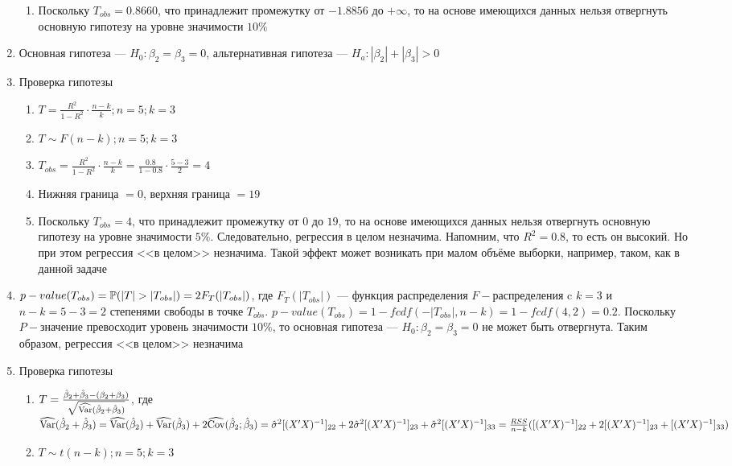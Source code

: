 \begin{solution}
\begin{enumerate}
\begin{enumerate}
\item Поскольку $T_{obs} = 0.8660$, что принадлежит промежутку от $-1.8856$ до $+\infty$, то на основе имеющихся данных нельзя отвергнуть основную гипотезу на уровне значимости $10\%$
\end{enumerate}
\item Основная гипотеза --- $H_0: \beta_2 = \beta_3 = 0$, альтернативная гипотеза --- $H_a: |\beta_2| + |\beta_3| > 0$
\item Проверка гипотезы
\begin{enumerate}
\item $T = \frac{R^2}{1 - R^2} \cdot \frac{n-k}{k}; n = 5; k = 3$
\item $T \sim F(n-k); n = 5; k = 3$
\item $T_{obs} = \frac{R^2}{1 - R^2} \cdot \frac{n-k}{k} = \frac{0.8}{1 - 0.8} \cdot \frac{5-3}{2} = 4$
\item Нижняя граница $= 0$, верхняя граница $= 19$
\item Поскольку $T_{obs} = 4$, что принадлежит промежутку от $0$ до $19$, то на основе имеющихся данных нельзя отвергнуть основную гипотезу на уровне значимости $5\%$. Следовательно, регрессия в целом незначима. Напомним, что $R^2 = 0.8$, то есть он высокий. Но при этом регрессия <<в целом>> незначима. Такой эффект может возникать при малом объёме выборки, например, таком, как в данной задаче
\end{enumerate}
\item $p-value(T_{obs}) = \P (|T|>|T_{obs}|) = 2F_{T}(|T_{obs}|)$, где $F_{T}(|T_{obs}|)$ --- функция распределения $F-$распределения c $k = 3$ и $n - k = 5 - 3 = 2$ степенями свободы в точке $T_{obs}$. $p-value(T_{obs}) = 1 - fcdf(-|T_{obs}|, n - k) = 1 - fcdf(4,2) = 0.2$. Поскольку $P-$значение превосходит уровень значимости $10\%$, то основная гипотеза --- $H_0: \beta_2 = \beta_3 = 0$ не может быть отвергнута. Таким образом, регрессия <<в целом>> незначима
\item Проверка гипотезы
\begin{enumerate}
\item $T = \frac{\hat{\beta}_2 + \hat{\beta}_3 - (\beta_2 + \beta_3)}{\sqrt{\widehat{\operatorname{Var}}(\hat{\beta}_2 + \hat{\beta}_3)}}$, где $\widehat{\operatorname{Var}}(\hat{\beta}_2 + \hat{\beta}_3) = \widehat{\operatorname{Var}}(\hat{\beta}_2) + \widehat{\operatorname{Var}}(\hat{\beta}_3) + 2\widehat{\operatorname{Cov}}(\hat{\beta}_2;\hat{\beta}_3) = \hat{\sigma}^2 [(X'X)^{-1}]_{22} + 2\hat{\sigma}^2 [(X'X)^{-1}]_{23} + \hat{\sigma}^2 [(X'X)^{-1}]_{33}= \frac{RSS}{n - k}([(X'X)^{-1}]_{22} + 2[(X'X)^{-1}]_{23} + [(X'X)^{-1}]_{33})$
\item $T \sim t(n-k); n = 5; k = 3$

\end{enumerate}
\end{enumerate}
\end{solution}
